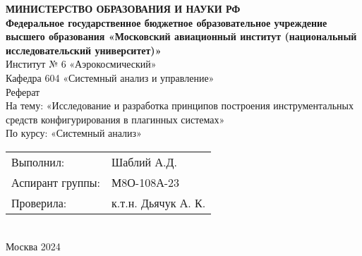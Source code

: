 \begin{center}
\textbf{МИНИСТЕРСТВО ОБРАЗОВАНИЯ И НАУКИ РФ}\\[4\baselineskip]
\textbf{Федеральное государственное бюджетное образовательное учреждение высшего образования «Московский авиационный институт (национальный исследовательский университет)»}\\[4\baselineskip]
Институт № 6 «Аэрокосмический» \\[1\baselineskip]
Кафедра 604 «Системный анализ и управление»\\[4\baselineskip]
Реферат\\[2\baselineskip]
На тему: «Исследование и разработка принципов построения инструментальных средств конфигурирования в плагинных системах»\\[1\baselineskip]
По курсу: «Системный анализ»\\[4\baselineskip]
\begin{tabularx}{\textwidth}{ >{\raggedright\arraybackslash}X >{\raggedleft\arraybackslash}X }
    
Выполнил: & Шаблий А.Д. \\
Аспирант группы: & М8О-108А-23 \\
Проверила: & к.т.н. Дьячук А. К. \\
    
\end{tabularx}\\[12\baselineskip]
Москва 2024

\end{center}